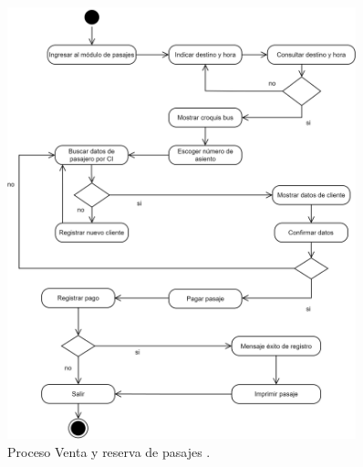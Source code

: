 	\begin{figure}[!h] %
		\caption[Diagrama de actividades - Venta pasajes]
		{\newline Proceso Venta y reserva de pasajes .} %
		\centering
		\includegraphics[width=0.9\textwidth]{imagenes/cap_3/pasaje.drawio.png} %
		
		\begin{flushleft}
		\end{flushleft}
		\vspace{-16pt}
		\label{fig:DA_pasajes} %
	\end{figure}
	
	\vspace{0.3cm} %
	
